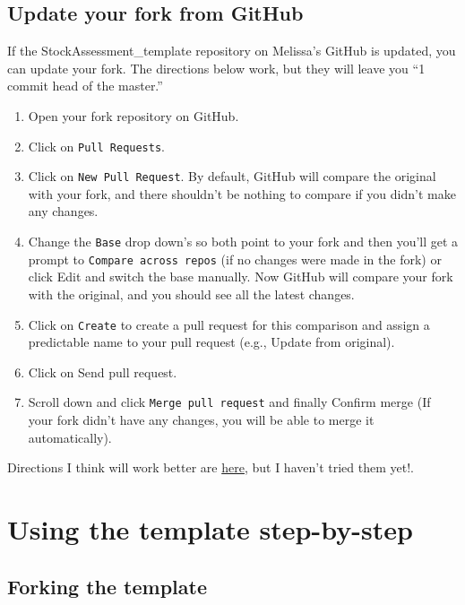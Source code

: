 \documentclass[12pt,]{article}
\providecommand{\tightlist}{%
  \setlength{\itemsep}{0pt}\setlength{\parskip}{0pt}}
\begin{document}
\subsection{Update your fork from
GitHub}\label{update-your-fork-from-github}

If the StockAssessment\_template repository on Melissa's GitHub is
updated, you can update your fork. The directions below work, but they
will leave you ``1 commit head of the master.''

\begin{enumerate}
\def\labelenumi{\arabic{enumi}.}
\tightlist
\item
  Open your fork repository on GitHub.
\item
  Click on \texttt{Pull\ Requests}.
\item
  Click on \texttt{New\ Pull\ Request}. By default, GitHub will compare
  the original with your fork, and there shouldn't be nothing to compare
  if you didn't make any changes.
\item
  Change the \texttt{Base} drop down's so both point to your fork and
  then you'll get a prompt to \texttt{Compare\ across\ repos} (if no
  changes were made in the fork) or click Edit and switch the base
  manually. Now GitHub will compare your fork with the original, and you
  should see all the latest changes.
\item
  Click on \texttt{Create} to create a pull request for this comparison
  and assign a predictable name to your pull request (e.g., Update from
  original).
\item
  Click on Send pull request.
\item
  Scroll down and click \texttt{Merge\ pull\ request} and finally
  Confirm merge (If your fork didn't have any changes, you will be able
  to merge it automatically).
\end{enumerate}

Directions I think will work better are
\href{https://2buntu.com/articles/1459/keeping-your-forked-repo-synced-with-the-upstream-source/}{here},
but I haven't tried them yet!.

\section{Using the template
step-by-step}\label{using-the-template-step-by-step}

\subsection{Forking the template}\label{forking-the-template}
\end{document}
